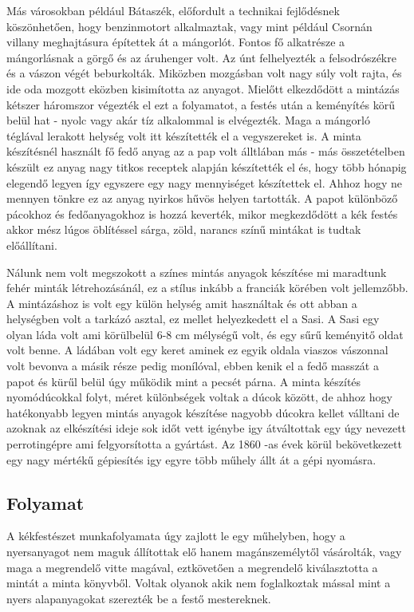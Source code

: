 Más városokban például Bátaszék, előfordult a technikai fejlődésnek köszönhetően, hogy benzinmotort alkalmaztak, vagy mint például Csornán villany meghajtásura építettek át a mángorlót. Fontos fő alkatrésze a mángorlásnak a görgő és az áruhenger volt. Az únt felhelyezték a felsodrószékre és a vászon végét beburkolták. Miközben mozgásban volt nagy súly volt rajta, és ide oda mozgott eközben kisimította az anyagot. Mielőtt elkezdődött a mintázás kétszer háromszor végezték el ezt a folyamatot, a festés után a keményítés körű belül hat - nyolc  vagy akár tíz alkalommal is elvégezték. Maga a mángorló téglával lerakott helység volt itt készítették el a vegyszereket is. 
A minta készítésnél használt fő fedő anyag az a pap volt álltlában más - más összetételben készült ez anyag nagy titkos receptek alapján készítették el és, hogy több hónapig elegendő legyen így egyszere egy nagy mennyiséget készítettek el.  Ahhoz hogy ne mennyen tönkre ez az anyag nyirkos hűvös helyen tartották. A papot különböző  pácokhoz és fedőanyagokhoz is hozzá keverték, mikor megkezdődött a kék festés akkor mész lúgos öblítéssel sárga, zöld, narancs színű mintákat is tudtak előállítani.

Nálunk nem volt megszokott a  színes mintás anyagok készítése mi maradtunk fehér minták létrehozásánál, ez a stílus inkább a franciák körében volt jellemzőbb. A mintázáshoz is volt egy külön helység amit használtak és ott abban a helységben volt a tarkázó asztal, ez mellet helyezkedett el a Sasi.
A Sasi egy olyan láda volt ami körülbelül 6-8 cm mélységű volt, és egy sűrű keményitő oldat volt benne. A ládában volt egy keret aminek ez egyik oldala viaszos vászonnal volt bevonva a másik része pedig monílóval, ebben kenik el a fedő masszát a papot és kürűl belül úgy működik mint a pecsét párna.
A minta készítés nyomódúcokkal folyt, méret különbségek voltak a dúcok között, de ahhoz hogy hatékonyabb legyen mintás anyagok készítése nagyobb dúcokra kellet válltani de azoknak az elkészítési ideje sok időt vett igénybe igy átváltottak egy úgy nevezett perrotingépre ami  felgyorsította a gyártást. Az 1860 -as évek körül bekövetkezett egy nagy mértékű gépiesítés igy egyre több műhely állt át a gépi nyomásra.

\subsection{Folyamat}

A kékfestészet munkafolyamata úgy zajlott le egy műhelyben, hogy a nyersanyagot nem maguk állítottak elő hanem magánszemélytől vásárolták,  vagy maga a megrendelő vitte magával, eztkövetően a megrendelő kiválasztotta a mintát a minta könyvből. 
Voltak olyanok akik nem foglalkoztak mással mint a nyers alapanyagokat szerezték be a festő mestereknek.

